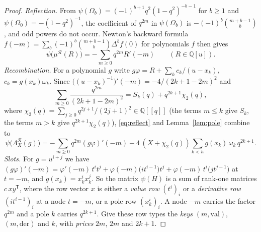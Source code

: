 \documentclass[11pt]{amsart}
\theoremstyle{definition}
\theoremstyle{remark}
\numberwithin{equation}{section}
\newcommand{\QQ}{\mathbb{Q}}
\newcommand{\cR}{\mathcal{R}}
\begin{document}
\begin{proof}
\emph{Reflection.} From $\psi(\Omega_b)=(-1)^{b+1}q^2(1-q^2)^{-b-1}$ for $b\ge1$ and $\psi(\Omega_0)=-(1-q^2)^{-1}$, the
coefficient of $q^{2m}$ in $\psi(\Omega_b)$ is $-(-1)^b\binom{m+b-1}{b}$, and odd powers do not occur. Newton's backward
formula $f(-m)=\sum_b(-1)^b\binom{m+b-1}b\Delta^bf(0)$ for polynomials $f$ then gives
\begin{equation}\label{eq:reflect}
  \psi\bigl(\mu^{\cR}(R)\bigr)=-\sum_{m\ge0}q^{2m}R'(-m)\qquad(R\in\QQ[u]).
\end{equation}
\emph{Recombination.} For a polynomial $g$ write $g\varphi=R+\sum_kc_k/(u-x_k)$, $c_k=g(x_k)\omega_k$. Since
$\bigl((u-x_k)^{-1}\bigr)'(-m)=-4/(2k+1-2m)^2$ and
\[
  \sum_{m\ge0}\frac{q^{2m}}{(2k+1-2m)^2}=S_k(q)+q^{2k+1}\chi_2(q),
\]
where $\chi_2(q)=\sum_{j\ge0}q^{2j+1}/(2j+1)^2\in\QQ[[q]]$ (the terms $m\le k$ give $S_k$, the terms $m>k$ give $q^{2k+1}\chi_2(q)$), \eqref{eq:reflect} and Lemma~\ref{lem:pole}
combine to
\begin{equation}\label{eq:recomb}
  \psi\bigl(\Lambda^{\cR}_X(g)\bigr)=-\sum_{m\ge0}q^{2m}(g\varphi)'(-m)-4\,(X+\chi_2(q))\sum_{k<h}g(x_k)\,\omega_k\,q^{2k+1}.
\end{equation}
\emph{Slots.} For $g=u^{i+j}$ we have
$(g\varphi)'(-m)=\varphi'(-m)\,t^it^j+\varphi(-m)\bigl(it^{i-1}\bigr)t^j+\varphi(-m)\,t^i\bigl(jt^{j-1}\bigr)$ at $t=-m$, and
$g(x_k)=x_k^ix_k^j$. So the matrix $\psi(H)$ is a sum of rank-one matrices $c\,xy^{\mathsf T}$, where the row vector $x$ is
either a \emph{value row} $(t^i)_i$ or a \emph{derivative row} $(it^{i-1})_i$ at a node $t=-m$, or a pole row
$(x_k^i)_i$. A node $-m$ carries the factor $q^{2m}$ and a pole $k$ carries $q^{2k+1}$. Give these row types the
\emph{keys} $(m,\mathrm{val})$, $(m,\mathrm{der})$ and $k$, with \emph{prices} $2m$, $2m$ and $2k+1$.


\end{proof}
\end{document}
